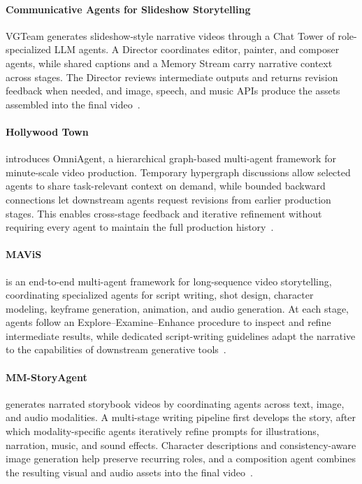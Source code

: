 \paragraph{Communicative Agents for Slideshow Storytelling}
VGTeam generates slideshow-style narrative videos through a Chat Tower of role-specialized LLM agents. A Director coordinates editor, painter, and composer agents, while shared captions and a Memory Stream carry narrative context across stages. The Director reviews intermediate outputs and returns revision feedback when needed, and image, speech, and music APIs produce the assets assembled into the final video~\cite{avg250901277}.

\paragraph{Hollywood Town}
 introduces OmniAgent, a hierarchical graph-based multi-agent framework for minute-scale video production. Temporary hypergraph discussions allow selected agents to share task-relevant context on demand, while bounded backward connections let downstream agents request revisions from earlier production stages. This enables cross-stage feedback and iterative refinement without requiring every agent to maintain the full production history~\cite{avg251022431}.

\paragraph{MAViS}
 is an end-to-end multi-agent framework for long-sequence video storytelling, coordinating specialized agents for script writing, shot design, character modeling, keyframe generation, animation, and audio generation. At each stage, agents follow an Explore--Examine--Enhance procedure to inspect and refine intermediate results, while dedicated script-writing guidelines adapt the narrative to the capabilities of downstream generative tools~\cite{avg250808487}.

\paragraph{MM-StoryAgent}
 generates narrated storybook videos by coordinating agents across text, image, and audio modalities. A multi-stage writing pipeline first develops the story, after which modality-specific agents iteratively refine prompts for illustrations, narration, music, and sound effects. Character descriptions and consistency-aware image generation help preserve recurring roles, and a composition agent combines the resulting visual and audio assets into the final video~\cite{avg250305242}.

